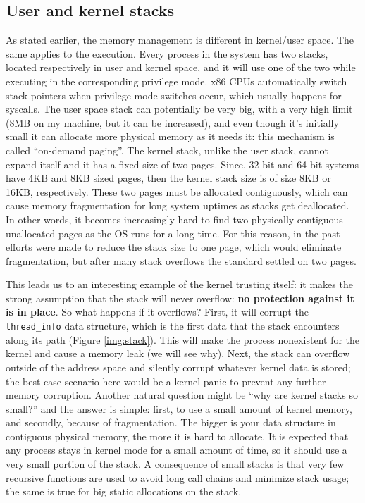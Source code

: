 \subsection{User and kernel stacks}
As stated earlier, the memory management is different in kernel/user space.
The same applies to the execution. Every process in the system has two stacks, located respectively in user and kernel space, and it will use one of the two while executing in the corresponding privilege mode. x86 CPUs automatically switch stack pointers when privilege mode switches occur, which usually happens for syscalls. The user space stack can potentially be very big, with a very high limit (8MB on my machine, but it can be increased), and even though it's initially small it can allocate more physical memory as it needs it: this mechanism is called ``on-demand paging''. The kernel stack, unlike the user stack, cannot expand itself and it has a fixed size of two pages. Since, 32-bit and 64-bit systems have 4KB and 8KB sized pages, then the kernel stack size is of size 8KB or 16KB, respectively. These two pages must be allocated contiguously, which can cause memory fragmentation for long system uptimes as stacks get deallocated. In other words, it becomes increasingly hard to find two physically contiguous unallocated pages as the OS runs for a long time. For this reason, in the past efforts were made to reduce the stack size to one page, which would eliminate fragmentation, but after many stack overflows the standard settled on two pages.

This leads us to an interesting example of the kernel trusting itself: it makes the strong assumption that the stack will never overflow: \textbf{no protection against it is in place}. So what happens if it overflows? First, it will corrupt the \verb|thread_info| data structure, which is the first data that the stack encounters along its path (Figure \ref{img:stack}). This will make the process nonexistent for the kernel and cause a memory leak (we will see why). Next, the stack can overflow outside of the address space and silently corrupt whatever kernel data is stored; the best case scenario here would be a kernel panic to prevent any further memory corruption. Another natural question might be ``why are kernel stacks so small?'' and the answer is simple: first, to use a small amount of kernel memory, and secondly, because of fragmentation. The bigger is your data structure in contiguous physical memory, the more it is hard to allocate. It is expected that any process stays in kernel mode for a small amount of time, so it should use a very small portion of the stack. A consequence of small stacks is that very few recursive functions are used to avoid long call chains and minimize stack usage; the same is true for big static allocations on the stack. %

